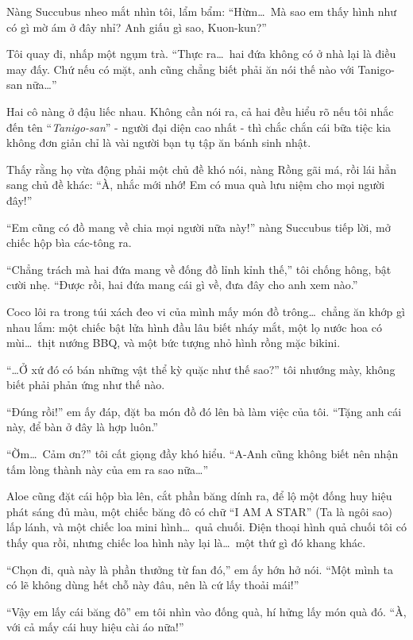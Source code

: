 \documentclass[../main.tex]{subfiles}
\begin{document}
Nàng Succubus nheo mắt nhìn tôi, lẩm bẩm: ``Hừm\dots\ Mà sao em thấy hình như có gì mờ ám ở đây nhỉ? Anh giấu gì sao, Kuon-kun?''

Tôi quay đi, nhấp một ngụm trà. ``Thực ra\dots\ hai đứa không có ở nhà lại là điều may đấy. Chứ nếu có mặt, anh cũng chẳng biết phải ăn nói thế nào với Tanigo-san nữa\dots''

Hai cô nàng ở đậu liếc nhau. Không cần nói ra, cả hai đều hiểu rõ nếu tôi nhắc đến tên ``\emph{Tanigo-san}'' - người đại diện cao nhất - thì chắc chắn cái bữa tiệc kia không đơn giản chỉ là vài người bạn tụ tập ăn bánh sinh nhật.

Thấy rằng họ vừa động phải một chủ đề khó nói, nàng Rồng gãi má, rồi lái hẳn sang chủ đề khác: ``À, nhắc mới nhớ! Em có mua quà lưu niệm cho mọi người đây!''

``Em cũng có đồ mang về chia mọi người nữa này!'' nàng Succubus tiếp lời, mở chiếc hộp bìa các-tông ra.

``Chẳng trách mà hai đứa mang về đống đồ lỉnh kỉnh thế,'' tôi chống hông, bật cười nhẹ. ``Được rồi, hai đứa mang cái gì về, đưa đây cho anh xem nào.''

Coco lôi ra trong túi xách đeo vi của mình mấy món đồ trông\dots\ chẳng ăn khớp gì nhau lắm: một chiếc bật lửa hình đầu lâu biết nháy mắt, một lọ nước hoa có mùi\dots\ thịt nướng BBQ, và một bức tượng nhỏ hình rồng mặc bikini.

``\dots Ở xứ đó có bán những vật thể kỳ quặc như thế sao?'' tôi nhướng mày, không biết phải phản ứng như thế nào.

``Đúng rồi!'' em ấy đáp, đặt ba món đồ đó lên bà làm việc của tôi. ``Tặng anh cái này, để bàn ở đây là hợp luôn.''

``Ờm\dots\ Cảm ơn?'' tôi cất giọng đầy khó hiểu. ``A-Anh cũng không biết nên nhận tấm lòng thành này của em ra sao nữa\dots''

Aloe cũng đặt cái hộp bìa lên, cắt phần băng dính ra, để lộ một đống huy hiệu phát sáng đủ màu, một chiếc băng đô có chữ ``I AM A STAR'' (Ta là ngôi sao) lấp lánh, và một chiếc loa mini hình\dots\ quả chuối.  Điện thoại hình quả chuối tôi có thấy qua rồi, nhưng chiếc loa hình này lại là\dots\ một thứ gì đó khang khác.

``Chọn đi, quà này là phần thưởng từ fan đó,'' em ấy hớn hở nói. ``Một mình ta có lẽ không dùng hết chỗ này đâu, nên là cứ lấy thoải mái!''

``Vậy em lấy cái băng đô'' em tôi nhìn vào đống quà, hí hửng lấy món quà đó. ``À, với cả mấy cái huy hiệu cài áo nữa!''
\end{document}
